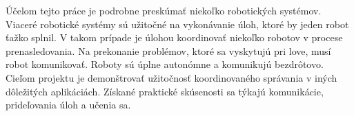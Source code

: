 \documentclass[]{tukediphc}
\begin{document}
\predhovor
Účelom tejto práce je podrobne preskúmať niekoľko robotických systémov. Viaceré robotické systémy sú užitočné na vykonávanie úloh, ktoré by jeden robot ťažko splnil. V takom prípade je úlohou koordinovať niekoľko robotov v procese prenasledovania. Na prekonanie problémov, ktoré sa vyskytujú pri love, musí robot komunikovať. Roboty sú úplne autonómne a komunikujú bezdrôtovo. Cieľom projektu je demonštrovať užitočnosť koordinovaného správania v iných dôležitých aplikáciách. Získané praktické skúsenosti sa týkajú komunikácie, prideľovania úloh a učenia sa.
\kpredhovoru

\thispagestyle{empty}
\tableofcontents
\thispagestyle{empty}

\newpage

\thispagestyle{empty}

{	\makeatletter
	\renewcommand{\l@figure}{\@dottedtocline{1}{1.5em}{3.5em}}
	\makeatother
	\listoffigures}



\newpage

\thispagestyle{empty}
\listoftables

\thispagestyle{empty}
\newpage
 
\thispagestyle{empty}
\printglossary %
\newpage

\slovnikterminov
\end{document}
